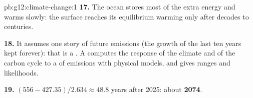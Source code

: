 \begin{solution}{pb:g12:climate-change:1}
\textbf{17.} The ocean stores most of the extra energy and warms slowly: the
surface reaches its equilibrium warming only after decades to centuries.

\textbf{18.} It assumes one story of future emissions (the growth of the
last ten years kept forever): that is a . A  computes the
response of the climate and of the carbon cycle to a  of emissions
with physical models, and gives ranges and likelihoods.

\textbf{19.} $(556 - 427.35)/2.634 \approx 48.8$ years after 2025: about
\textbf{2074}.
\end{solution}
